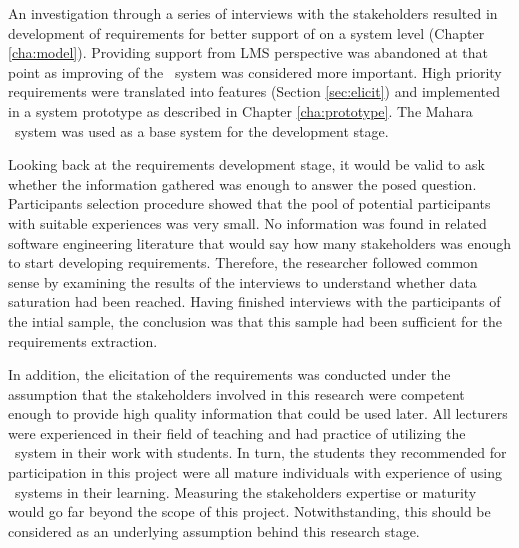 \vspace{2 mm}


\vspace{2 mm}

An investigation through a series of interviews with the stakeholders resulted
in development of requirements for better support of \LLLs on a system level
(Chapter \ref{cha:model}). Providing support from LMS perspective was abandoned
at that point as improving of the \ep~system was considered more important.
High priority requirements were translated into features (Section
\ref{sec:elicit}) and implemented in a system prototype as described in Chapter
\ref{cha:prototype}. The Mahara \ep~system was used as a base system for the
development stage.

\vspace{2 mm}

Looking back at the requirements development stage, it would be valid to ask
whether the information gathered was enough to answer the posed question.
Participants selection procedure showed that the pool of potential participants
with suitable experiences was very small. No information was found in related
software engineering literature that would say how many stakeholders was enough
to start developing requirements. Therefore, the researcher followed common
sense by examining the results of the interviews to understand whether data
saturation had been reached. Having finished interviews with the participants
of the intial sample, the conclusion was that this sample had been sufficient
for the requirements extraction.

\vspace{2 mm}

In addition, the elicitation of the requirements was conducted under the
assumption that the stakeholders involved in this research were competent enough
to provide high quality information that could be used later. All lecturers were
experienced in their field of teaching and had practice of utilizing the
\ep~system in their work with students. In turn, the students they recommended
for participation in this project were all mature individuals with experience of
using \ep~systems in their learning. Measuring the stakeholders expertise or
maturity would go far beyond the scope of this project. Notwithstanding, this
should be considered as an underlying assumption behind this research stage.

